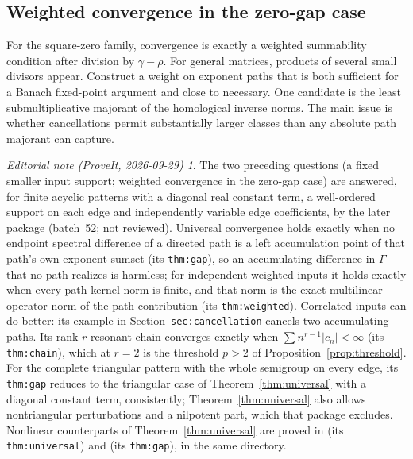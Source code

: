 \documentclass[11pt,a4paper]{article}
\numberwithin{equation}{section}
\theoremstyle{definition}
\theoremstyle{remark}
\newtheorem*{ednote}{Editorial note (ProveIt, 2026-09-29)}
\newcommand{\G}{\Gamma}
\newcommand{\abs}[1]{\left\lvert #1\right\rvert}
\begin{document}
\subsection{Weighted convergence in the zero-gap case}
For the square-zero family, convergence is exactly a weighted summability
condition after division by $\gamma-\rho$. For general matrices, products
of several small divisors appear. Construct a weight on exponent paths that
is both sufficient for a Banach fixed-point argument and close to necessary.
One candidate is the least submultiplicative majorant of the homological
inverse norms. The main issue is whether cancellations permit substantially
larger classes than any absolute path majorant can capture.
\begin{ednote}
The two preceding questions (a fixed smaller input support; weighted
convergence in the zero-gap case) are answered, for finite acyclic patterns
with a diagonal real constant term, a well-ordered support on each edge and
independently variable edge coefficients, by the later package
(batch~52; not reviewed). Universal convergence holds exactly when no
endpoint spectral difference of a directed path is a left accumulation
point of that path's own exponent sumset (its \texttt{thm:gap}), so an
accumulating difference in \(\G\) that no path realizes is harmless; for
independent weighted inputs it holds exactly when every path-kernel norm
is finite, and that norm is the exact multilinear operator norm of the
path contribution (its \texttt{thm:weighted}). Correlated inputs can do
better: its example in Section~\texttt{sec:cancellation} cancels two
accumulating paths. Its rank-\(r\) resonant chain converges exactly when
\(\sum n^{r-1}\abs{c_n}<\infty\) (its \texttt{thm:chain}), which at
\(r=2\) is the threshold \(p>2\) of Proposition~\ref{prop:threshold}. For
the complete triangular pattern with the whole semigroup on every edge, its
\texttt{thm:gap} reduces to the triangular case of
Theorem~\ref{thm:universal} with a diagonal constant term, consistently;
Theorem~\ref{thm:universal} also allows nontriangular perturbations and a
nilpotent part, which that package excludes.
Nonlinear counterparts of Theorem~\ref{thm:universal} are proved in
 (its
\texttt{thm:universal}) and
 (its
\texttt{thm:gap}), in the same directory.
\end{ednote}
\end{document}
